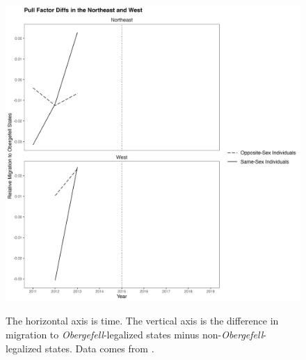 \documentclass[12pt,letterpaper]{article}
\begin{document}
\begin{figure}[htbp]
    \centering
    \caption{}
    \label{fig: region_post_diffs_app}
    \includegraphics[width=.75\linewidth]{outputs/summary_stats/region_post_diffs_app.png}

    \vspace{0.5em}
    \begin{minipage}{0.75\linewidth}
        \footnotesize The horizontal axis is time. The vertical axis is the difference in migration to \textit{Obergefell}-legalized states minus non-\textit{Obergefell}-legalized states. Data comes from \citet{28}.
    \end{minipage}
\end{figure}
\end{document}
